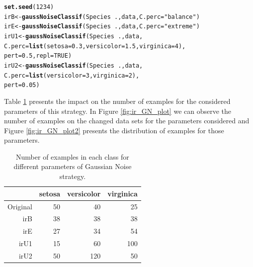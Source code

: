 \documentclass[10pt,a4paper]{article}\usepackage[]{graphicx}\usepackage[]{color}
\makeatletter
\newcommand{\hlnum}[1]{\textcolor[rgb]{0.686,0.059,0.569}{#1}}%
\newcommand{\hlstr}[1]{\textcolor[rgb]{0.192,0.494,0.8}{#1}}%
\newcommand{\hlopt}[1]{\textcolor[rgb]{0,0,0}{#1}}%
\newcommand{\hlstd}[1]{\textcolor[rgb]{0.345,0.345,0.345}{#1}}%
\newcommand{\hlkwb}[1]{\textcolor[rgb]{0.69,0.353,0.396}{#1}}%
\newcommand{\hlkwc}[1]{\textcolor[rgb]{0.333,0.667,0.333}{#1}}%
\newcommand{\hlkwd}[1]{\textcolor[rgb]{0.737,0.353,0.396}{\textbf{#1}}}%
\newenvironment{kframe}{%
 \def\at@end@of@kframe{}%
 \ifinner\ifhmode%
  \def\at@end@of@kframe{\end{minipage}}%
  \begin{minipage}{\columnwidth}%
 \fi\fi%
 \def\FrameCommand##1{\hskip\@totalleftmargin \hskip-\fboxsep
 \colorbox{shadecolor}{##1}\hskip-\fboxsep
     \hskip-\linewidth \hskip-\@totalleftmargin \hskip\columnwidth}%
 \MakeFramed {\advance\hsize-\width
   \@totalleftmargin\z@ \linewidth\hsize
   \@setminipage}}%
 {\par\unskip\endMakeFramed%
 \at@end@of@kframe}
\newenvironment{knitrout}{}{} %
\makeatother
\begin{document}
\begin{knitrout}\footnotesize
{}\color{fgcolor}\begin{kframe}
\begin{alltt}
\hlkwd{set.seed}\hlstd{(}\hlnum{1234}\hlstd{)}
\hlstd{irB}\hlkwb{<-} \hlkwd{gaussNoiseClassif}\hlstd{(Species}\hlopt{~}\hlstd{., data,} \hlkwc{C.perc}\hlstd{=}\hlstr{"balance"}\hlstd{)}
\hlstd{irE} \hlkwb{<-} \hlkwd{gaussNoiseClassif}\hlstd{(Species}\hlopt{~}\hlstd{., data,}\hlkwc{C.perc}\hlstd{=}\hlstr{"extreme"}\hlstd{)}
\hlstd{irU1} \hlkwb{<-} \hlkwd{gaussNoiseClassif}\hlstd{(Species}\hlopt{~}\hlstd{., data,}
                          \hlkwc{C.perc}\hlstd{=}\hlkwd{list}\hlstd{(}\hlkwc{setosa}\hlstd{=}\hlnum{0.3}\hlstd{,} \hlkwc{versicolor}\hlstd{=}\hlnum{1.5}\hlstd{,} \hlkwc{virginica}\hlstd{=}\hlnum{4}\hlstd{),}
                          \hlkwc{pert}\hlstd{=}\hlnum{0.5}\hlstd{,} \hlkwc{repl}\hlstd{=}\hlnum{TRUE}\hlstd{)}
\hlstd{irU2} \hlkwb{<-} \hlkwd{gaussNoiseClassif}\hlstd{(Species}\hlopt{~}\hlstd{., data,}
                          \hlkwc{C.perc}\hlstd{=}\hlkwd{list}\hlstd{(}\hlkwc{versicolor}\hlstd{=}\hlnum{3}\hlstd{,} \hlkwc{virginica}\hlstd{=}\hlnum{2}\hlstd{),}
                          \hlkwc{pert}\hlstd{=}\hlnum{0.05}\hlstd{)}
\end{alltt}
\end{kframe}
\end{knitrout}


Table \ref{tab:iris_GN_table} presents the impact on the number of examples for the considered parameters of this strategy. In Figure \ref{fig:ir_GN_plot} we can observe the number of examples on the changed data sets for the parameters considered and Figure \ref{fig:ir_GN_plot2} presents the distribution of examples for those parameters.



\begin{table}[ht]
\centering
\begin{tabular}{rrrr}
  \hline
 & setosa & versicolor & virginica \\ 
  \hline
Original &  50 &  40 &  25 \\ 
  irB &  38 &  38 &  38 \\ 
  irE &  27 &  34 &  54 \\ 
  irU1 &  15 &  60 & 100 \\ 
  irU2 &  50 & 120 &  50 \\ 
   \hline
\end{tabular}
\caption{Number of examples in each class for different parameters of Gaussian Noise strategy.} 
\label{tab:iris_GN_table}
\end{table}
\end{document}
